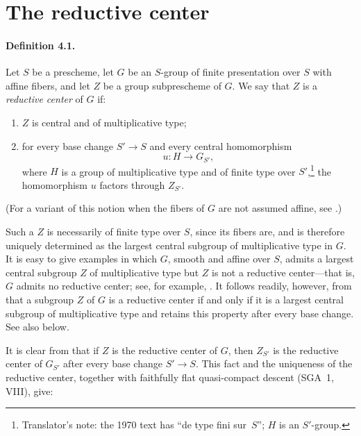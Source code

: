 
\section{The reductive center}

\paragraph{\textbf{Definition 4.1.}}
Let \(S\) be a prescheme, let \(G\) be an \(S\)-group of finite
presentation over \(S\) with affine fibers, and let \(Z\) be a group
subprescheme of \(G\). We say that \(Z\) is a \emph{reductive center}
of \(G\) if:

\begin{enumerate}
\item[(i)] \(Z\) is central and of multiplicative type;
\item[(ii)] for every base change \(S'\to S\) and every central
homomorphism
\[
  u:H\longrightarrow G_{S'},
\]
where \(H\) is a group of multiplicative type and of finite type over
\(S'\),\footnote{Translator's note: the 1970 text has ``de type fini
sur~\(S\)''; \(H\) is an \(S'\)-group.} the homomorphism \(u\) factors
through \(Z_{S'}\).
\end{enumerate}

(For a variant of this notion when the fibers of \(G\) are not
assumed affine, see .)

Such a \(Z\) is necessarily of finite type over \(S\), since its
fibers are, and is therefore uniquely determined as the largest
central subgroup of multiplicative type in \(G\). It is easy to give
examples in which \(G\), smooth and affine over \(S\), admits a
largest central subgroup \(Z\) of multiplicative type but \(Z\) is
not a reductive center---that is, \(G\) admits no reductive center;
see, for example, . It follows readily, however, from  that
a subgroup \(Z\) of \(G\) is a reductive center if and only if it is
a largest central subgroup of multiplicative type and retains this
property after every base change. See also  below.

It is clear from  that if \(Z\) is the reductive center of \(G\),
then \(Z_{S'}\) is the reductive center of \(G_{S'}\) after every base
change \(S'\to S\). This fact and the uniqueness of the reductive
center, together with faithfully flat quasi-compact descent
(SGA~1, VIII), give:

